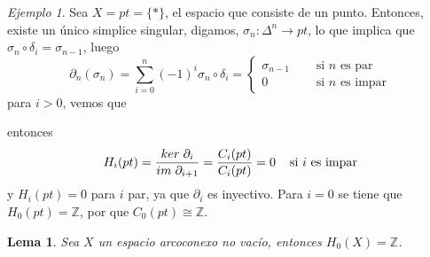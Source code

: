 \documentclass[aop]{imsart2}
\theoremstyle{plain}
\newtheorem{lema}[teo]{Lema}
\theoremstyle{remark}
\newtheorem*{ej}{Ejemplo}
\newcommand{\htext}[1]{\hspace{4mm}\text{#1 }}
\newcommand{\im}[1]{im\hspace{1mm}#1}
\newcommand{\kr}[1]{ker\hspace{1mm}#1}
\def \Z {\mathbb{Z}}
\begin{document}
\begin{ej}
    Sea $X=pt=\{*\}$, el espacio que consiste de un punto. Entonces, existe un único simplice
    singular, digamos, $\sigma_{n}:\Delta^{n}\to pt$, lo que implica que 
    $\sigma_{n}\circ\delta_{i}=\sigma_{n-1}$, luego
    \begin{equation*}
        \partial_{n}(\sigma_{n})=\sum_{i=0}^{n}(-1)^{i}\sigma_{n}\circ\delta_{i}
        =\begin{cases}
            \sigma_{n-1} &\quad\text{ si }n\text{ es par} \\
            0 &\quad\text{ si }n\text{ es impar}
        \end{cases}
    \end{equation*}
    para $i>0$, vemos que

    \vspace{2mm}
    \centerline{
    }
    \noindent entonces
    \begin{equation*}
        H_{i}(pt)=\frac{\kr{\partial_{i}}}{\im{\partial_{i+1}}}=\frac{C_{i}(pt)}{C_{i}(pt)}=0
        \htext{si }i\text{ es impar}
    \end{equation*}
    y $H_{i}(pt)=0$ para $i$ par, ya que $\partial_{i}$ es inyectivo. Para $i=0$ se tiene que 
    $H_{0}(pt)=\Z$, por que $C_{0}(pt)\cong\Z$.
\end{ej}

\begin{lema}
    Sea $X$ un espacio arcoconexo no vacío, entonces $H_{0}(X)=\Z$.
\end{lema}
\end{document}
